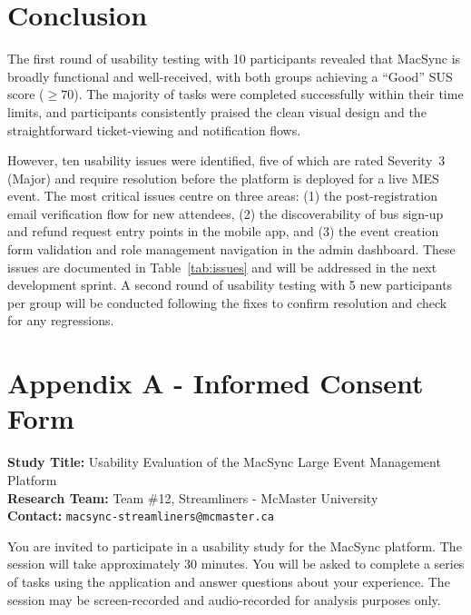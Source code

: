 \documentclass[12pt, titlepage]{article}
\begin{document}
\section{Conclusion}


The first round of usability testing with 10 participants revealed that MacSync is broadly functional and well-received, with both groups achieving a ``Good'' SUS score ($\geq 70$). The majority of tasks were completed successfully within their time limits, and participants consistently praised the clean visual design and the straightforward ticket-viewing and notification flows.


However, ten usability issues were identified, five of which are rated Severity~3 (Major) and require resolution before the platform is deployed for a live MES event. The most critical issues centre on three areas: (1) the post-registration email verification flow for new attendees, (2) the discoverability of bus sign-up and refund request entry points in the mobile app, and (3) the event creation form validation and role management navigation in the admin dashboard. These issues are documented in Table~\ref{tab:issues} and will be addressed in the next development sprint. A second round of usability testing with 5 new participants per group will be conducted following the fixes to confirm resolution and check for any regressions.


\newpage


\section*{Appendix A - Informed Consent Form}


\noindent\textbf{Study Title:} Usability Evaluation of the MacSync Large Event Management Platform\\
\textbf{Research Team:} Team \#12, Streamliners - McMaster University\\
\textbf{Contact:} \texttt{macsync-streamliners@mcmaster.ca}


\vspace{1em}
\noindent You are invited to participate in a usability study for the MacSync platform. The session will take approximately 30 minutes. You will be asked to complete a series of tasks using the application and answer questions about your experience. The session may be screen-recorded and audio-recorded for analysis purposes only.
\end{document}
